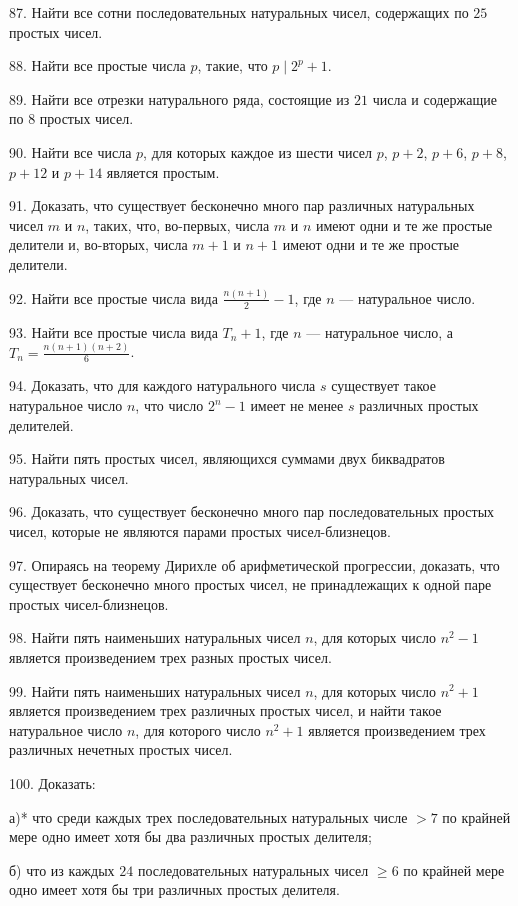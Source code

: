 \documentclass[12pt, a4paper, openany]{book}
\begin{document}
87. Найти все сотни последовательных натуральных чисел, содержащих по $25$ простых чисел.

88. Найти все простые числа $p$, такие, что $p \mid 2^p + 1$.

89. Найти все отрезки натурального ряда, состоящие из $21$ числа и содержащие по $8$ простых чисел.

90. Найти все числа $p$, для которых каждое из шести чисел $p$, $p+2$, $p+6$, $p+8$, $p+12$ и $p+14$ является простым.

91. Доказать, что существует бесконечно много пар различных натуральных чисел $m$ и $n$, таких, что, во-первых, числа $m$ и $n$ имеют одни	и те же простые делители и, во-вторых, числа $m+1$ и $n+1$ имеют одни и те же простые делители.

92. Найти все простые числа вида $\displaystyle \frac{n(n+1)}{2}-1$, где $n$ — натуральное число.

93. Найти все простые числа вида $T_n + 1$, где $n$ — натуральное число, а $\displaystyle T_n = \frac{n(n+1)(n+2)}{6}$.

94. Доказать, что для каждого натурального числа $s$ существует такое натуральное число $n$, что число $2^n - 1$ имеет не менее $s$ различных простых делителей.

95. Найти пять простых чисел, являющихся суммами двух биквадратов натуральных чисел.

96. Доказать, что существует бесконечно много пар последовательных простых чисел, которые не являются парами простых чисел-близнецов.

97. Опираясь на теорему Дирихле об арифметической прогрессии, доказать, что существует бесконечно много простых чисел, не принадлежащих к одной паре простых чисел-близнецов.

98. Найти пять наименьших натуральных чисел $n$, для которых число $n^2 - 1$ является произведением трех разных простых чисел.

99. Найти пять наименьших натуральных чисел $n$, для которых число $n^2 + 1$ является произведением трех различных простых чисел, и найти такое натуральное число $n$, для которого число $n^2 + 1$ является произведением трех различных нечетных простых чисел.

100. Доказать:

а)* что среди каждых трех последовательных натуральных числе $>7$ по крайней мере одно имеет хотя бы два различных простых делителя;

б) что из каждых $24$ последовательных натуральных чисел  $\geqslant 6$ по крайней мере одно имеет хотя бы три различных простых делителя.
\end{document}
